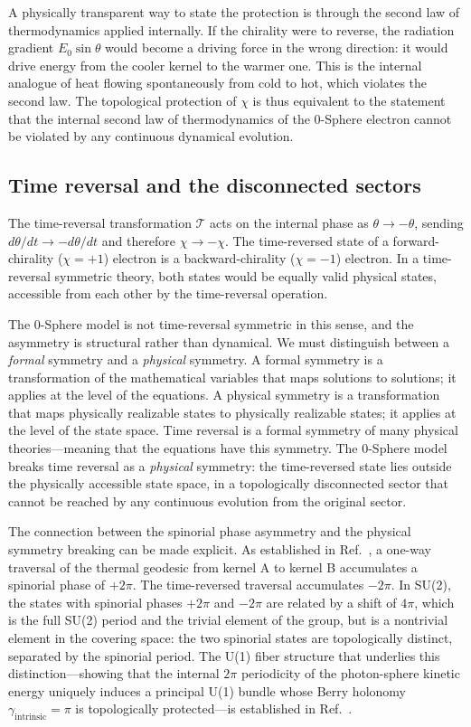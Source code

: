\documentclass[%
 reprint, amsmath,amssymb, aps, prb, ]{revtex4-2}
\numberwithin{equation}{section}
\begin{document}
A physically transparent way to state the protection is through the second law of thermodynamics applied internally. If the chirality were to reverse, the radiation gradient $E_0 \sin\theta$ would become a driving force in the wrong direction: it would drive energy from the cooler kernel to the warmer one. This is the internal analogue of heat flowing spontaneously from cold to hot, which violates the second law. The topological protection of $\chi$ is thus equivalent to the statement that the internal second law of thermodynamics of the 0-Sphere electron cannot be violated by any continuous dynamical evolution.

\subsection{Time reversal and the disconnected sectors}
\label{sec:time_reversal_sectors}

The time-reversal transformation $\mathcal{T}$ acts on the internal phase as $\theta \to -\theta$, sending $d\theta/dt \to -d\theta/dt$ and therefore $\chi \to -\chi$. The time-reversed state of a forward-chirality ($\chi = +1$) electron is a backward-chirality ($\chi = -1$) electron. In a time-reversal symmetric theory, both states would be equally valid physical states, accessible from each other by the time-reversal operation.

The 0-Sphere model is not time-reversal symmetric in this sense, and the asymmetry is structural rather than dynamical. We must distinguish between a \emph{formal} symmetry and a \emph{physical} symmetry. A formal symmetry is a transformation of the mathematical variables that maps solutions to solutions; it applies at the level of the equations. A physical symmetry is a transformation that maps physically realizable states to physically realizable states; it applies at the level of the state space. Time reversal is a formal symmetry of many physical theories---meaning that the equations have this symmetry. The 0-Sphere model breaks time reversal as a \emph{physical} symmetry: the time-reversed state lies outside the physically accessible state space, in a topologically disconnected sector that cannot be reached by any continuous evolution from the original sector.

The connection between the spinorial phase asymmetry and the physical symmetry breaking can be made explicit. As established in Ref.~\cite{hanamura29}, a one-way traversal of the thermal geodesic from kernel A to kernel B accumulates a spinorial phase of $+2\pi$. The time-reversed traversal accumulates $-2\pi$. In SU(2), the states with spinorial phases $+2\pi$ and $-2\pi$ are related by a shift of $4\pi$, which is the full SU(2) period and the trivial element of the group, but is a nontrivial element in the covering space: the two spinorial states are topologically distinct, separated by the spinorial period. The U(1) fiber structure that underlies this distinction---showing that the internal $2\pi$ periodicity of the photon-sphere kinetic energy uniquely induces a principal U(1) bundle whose Berry holonomy $\gamma_{\mathrm{intrinsic}} = \pi$ is topologically protected---is established in Ref.~\cite{hanamura48}.
\end{document}
